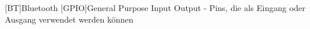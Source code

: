 
\begin{acronym}[ACRONYM]
[BT]{Bluetooth}
[GPIO]{General Purpose Input Output - Pins, die als Eingang oder Ausgang verwendet werden können}
\end{acronym}\newpage

